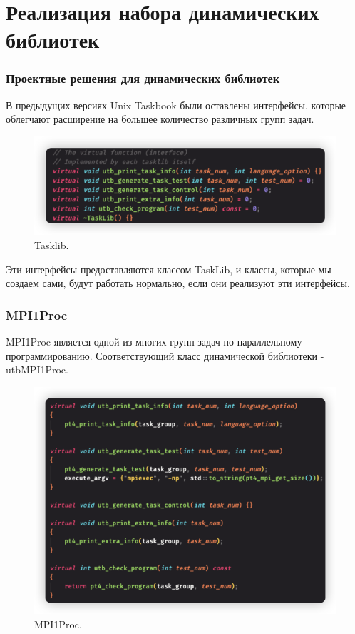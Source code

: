\section{Реализация набора динамических библиотек}

\begin{frame}
\frametitle{Проектные решения для динамических библиотек}

В предыдущих версиях Unix Taskbook были оставлены интерфейсы, которые облегчают расширение на большее количество различных групп задач.



\begin{figure}[htbp]%
    \centering
    \includegraphics[width=0.8\linewidth]{images/tasklib.jpg}%
    \caption{Tasklib.}%
    \label{tasklib}%
\end{figure} 

Эти интерфейсы предоставляются классом TaskLib, и классы, которые мы создаем сами, будут работать нормально, если они реализуют эти интерфейсы.

\end{frame}


\begin{frame}
\frametitle{MPI1Proc}
\begin{example}
MPI1Proc является одной из многих групп задач по параллельному программированию. Соответствующий класс динамической библиотеки - utbMPI1Proc.
\end{example}
\begin{figure}[htbp]%
    \centering
    \includegraphics[width=0.5\linewidth]{images/1proc.jpg}%
    \caption{MPI1Proc.}%
    \label{proc}%
\end{figure} 

\end{frame}

